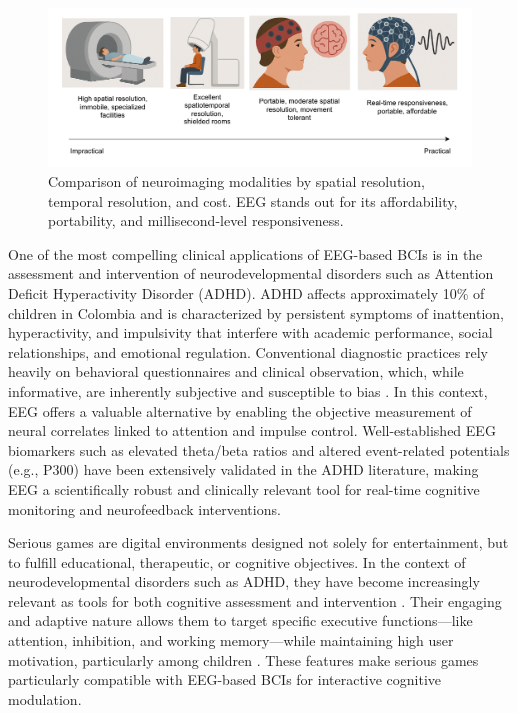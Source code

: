 \begin{figure}[h]
 \centering
 \includegraphics[width=1\textwidth]{Cap 1/Figures/Neuroimage.pdf}
 \caption{Comparison of neuroimaging modalities by spatial resolution, temporal resolution, and cost. EEG stands out for its affordability, portability, and millisecond-level responsiveness.}
 \label{fig:neuroimaging_comparison}
\end{figure}

One of the most compelling clinical applications of EEG-based BCIs is in the assessment and intervention of neurodevelopmental disorders such as Attention Deficit Hyperactivity Disorder (ADHD). ADHD affects approximately 10\% of children in Colombia \cite{salari2023global,pineda2003prevalence} and is characterized by persistent symptoms of inattention, hyperactivity, and impulsivity that interfere with academic performance, social relationships, and emotional regulation. Conventional diagnostic practices rely heavily on behavioral questionnaires and clinical observation, which, while informative, are inherently subjective and susceptible to bias \cite{raiker2017accuracy}. In this context, EEG offers a valuable alternative by enabling the objective measurement of neural correlates linked to attention and impulse control. Well-established EEG biomarkers such as elevated theta/beta ratios and altered event-related potentials (e.g., P300) have been extensively validated in the ADHD literature, making EEG a scientifically robust and clinically relevant tool for real-time cognitive monitoring and neurofeedback interventions.

Serious games are digital environments designed not solely for entertainment, but to fulfill educational, therapeutic, or cognitive objectives. In the context of neurodevelopmental disorders such as ADHD, they have become increasingly relevant as tools for both cognitive assessment and intervention \cite{Patino2025}. Their engaging and adaptive nature allows them to target specific executive functions—like attention, inhibition, and working memory—while maintaining high user motivation, particularly among children \cite{RodriguezTimana2024}. These features make serious games particularly compatible with EEG-based BCIs for interactive cognitive modulation.


